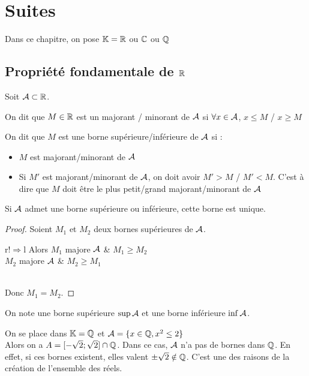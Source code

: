 \chapter{Suites}
Dans ce chapitre, on pose $\KK = \RR$ ou $\CC$ ou $\QQ$

\section{Propriété fondamentale de $\RR$}
Soit $\AA \subset \RR$.

\begin{defi}
On dit que $M \in \RR$ est un majorant / minorant de $\AA$ si $\forall x \in \AA$, $x \leq M$ / $x \geq M$
\end{defi}
\begin{defi}
On dit que $M$ est une borne supérieure/inférieure de $\AA$ si :
\begin{itemize}
	\item $M$ est majorant/minorant de $\AA$
	\item Si $M'$ est majorant/minorant de $\AA$, on doit avoir $M'>M$ / $M'<M$. C'est à dire que $M$ doit être le plus petit/grand majorant/minorant de $\AA$
\end{itemize}
\end{defi}
\begin{prop}
Si $\AA$ admet une borne supérieure ou inférieure, cette borne est unique.
\end{prop}

\begin{proof}

Soient $M_1$ et $M_2$ deux bornes supérieures de $\AA$.\\
\begin{tabular}{r!{$\Rightarrow$}l}
	Alors $M_1$ majore $\AA$ & $M_1 \geq M_2$\\
	$M_2$ majore $\AA$ & $M_2 \geq M_1$
\end{tabular}\\
Donc $M_1=M_2$.
\end{proof}

\begin{nota}
On note une borne supérieure $\sup \AA$ et une borne inférieure $\inf \AA$.
\end{nota}

\begin{rem}
On se place dans $\KK = \QQ$ et $\AA = \{x\in \QQ, x^2\leq 2\}$\\
Alors on a $A =[-\sqrt{2};\sqrt{2}] \cap \QQ$. Dans ce cas, $\AA$ n'a pas de bornes dans $\QQ$. En effet, si ces bornes existent, elles valent $\pm \sqrt{2} \notin \QQ$. C'est une des raisons de la création de l'ensemble des réels.
\end{rem}

